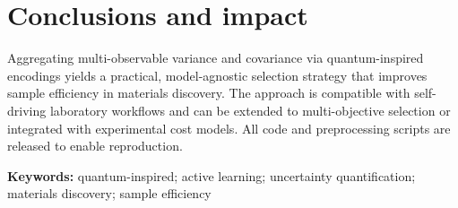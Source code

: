 \documentclass[11pt]{article}
\begin{document}
\section*{Conclusions and impact}
Aggregating multi-observable variance and covariance via quantum-inspired encodings yields a practical, model-agnostic selection strategy that improves sample efficiency in materials discovery. The approach is compatible with self-driving laboratory workflows and can be extended to multi-objective selection or integrated with experimental cost models. All code and preprocessing scripts are released to enable reproduction.

\vspace{6pt}
\noindent\textbf{Keywords:} quantum-inspired; active learning; uncertainty quantification; materials discovery; sample efficiency
\end{document}
